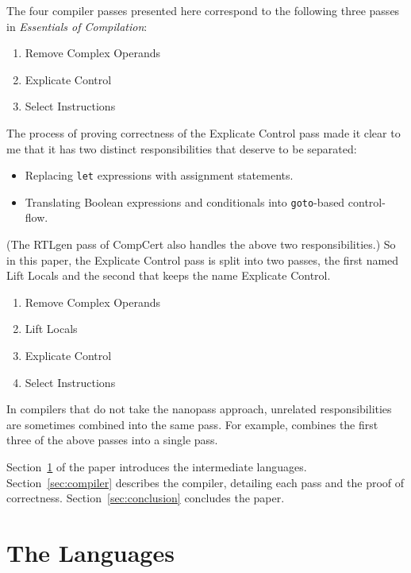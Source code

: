 \documentclass[sigplan,review,dvipsnames,screen,10pt]{acmart}
\begin{document}
The four compiler passes presented here correspond to the
following three passes in \emph{Essentials of Compilation}:
\begin{enumerate}
\item Remove Complex Operands
\item Explicate Control
\item Select Instructions
\end{enumerate}
The process of proving correctness of the Explicate Control pass
made it clear to me that it has two distinct responsibilities that
deserve to be separated:
\begin{itemize}
\item Replacing \texttt{let} expressions with assignment statements.
\item Translating Boolean expressions and conditionals into
  \texttt{goto}-based control-flow.
\end{itemize}
(The RTLgen pass of CompCert also handles the above two
responsibilities.)  So in this paper, the Explicate Control pass is
split into two passes, the first named Lift Locals and the second that
keeps the name Explicate Control.
\begin{enumerate}
\item Remove Complex Operands
\item Lift Locals
\item Explicate Control
\item Select Instructions
\end{enumerate}
In compilers that do not take the nanopass approach, unrelated
responsibilities are sometimes combined into the same pass.  For
example, \citet{Sumii:2005aa} combines the first three of the above
passes into a single pass.

Section~\ref{sec:langs} of the paper introduces the intermediate
languages. Section~\ref{sec:compiler} describes the compiler,
detailing each pass and the proof of
correctness. Section~\ref{sec:conclusion} concludes the paper.

\section{The Languages}
\label{sec:langs}
\end{document}
